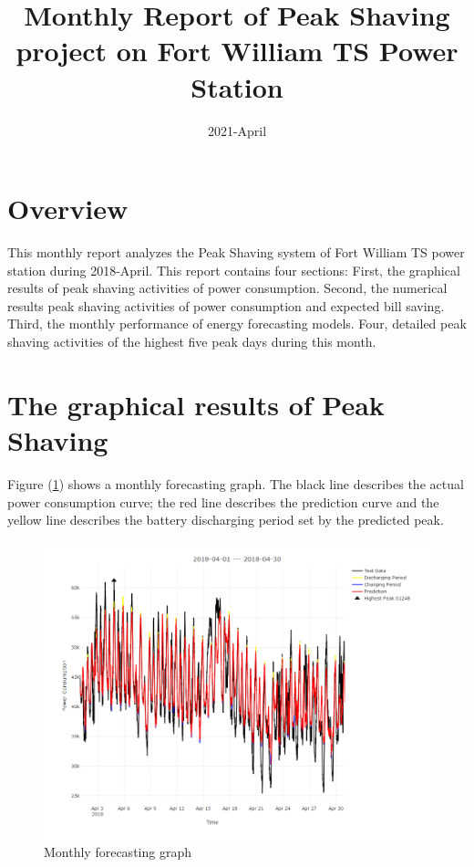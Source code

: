 \documentclass[
]{article}
\title{Monthly Report of Peak Shaving project on Fort William TS Power Station}
\author{}
\date{\vspace{-2.5em}2021-April}
\begin{document}
\maketitle

\hypertarget{overview}{%
\section{Overview}\label{overview}}

This monthly report analyzes the Peak Shaving system of Fort William TS
power station during 2018-April. This report contains four sections:
First, the graphical results of peak shaving activities of power
consumption. Second, the numerical results peak shaving activities of
power consumption and expected bill saving. Third, the monthly
performance of energy forecasting models. Four, detailed peak shaving
activities of the highest five peak days during this month.

\hypertarget{the-graphical-results-of-peak-shaving}{%
\section{The graphical results of Peak
Shaving}\label{the-graphical-results-of-peak-shaving}}

Figure (\ref{fig:fig1}) shows a monthly forecasting graph. The black
line describes the actual power consumption curve; the red line
describes the prediction curve and the yellow line describes the battery
discharging period set by the predicted peak.

\begin{figure}[H]
\includegraphics[width=1\linewidth]{monthly} \caption{Monthly forecasting graph\label{fig1}}\label{fig:fig1}
\end{figure}
\end{document}
